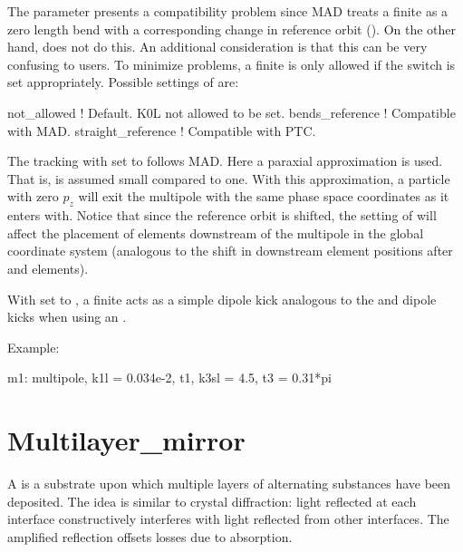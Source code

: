{The  parameter presents a compatibility problem since MAD treats a finite  as a zero
length bend with a corresponding change in reference orbit (). On the other hand,
 does not do this. An additional consideration is that this can be very confusing to
users. To minimize problems, a finite  is only allowed if the  switch is set
appropriately. Possible settings of  are:
\begin{example}
  not_allowed           ! Default. K0L not allowed to be set. 
  bends_reference       ! Compatible with MAD.
  straight_reference    ! Compatible with PTC.
\end{example}
The tracking with  set to  follows MAD. Here a paraxial
approximation is used. That is,  is assumed small compared to one. With this approximation,
a particle with zero $p_z$ will exit the multipole with the same phase space coordinates as it
enters with. Notice that since the reference orbit is shifted, the setting of  will affect
the placement of elements downstream of the multipole in the global coordinate system (analogous to
the shift in downstream element positions after  and  elements).

With  set to , a finite  acts as a simple dipole kick
analogous to the  and  dipole kicks when using an .

Example:
\begin{example}
  m1: multipole, k1l = 0.034e-2, t1, k3sl = 4.5, t3 = 0.31*pi
\end{example}

\newpage

\section{Multilayer_mirror}
\label{s:multilayer}

A  is a substrate upon which multiple layers of alternating substances have
been deposited. The idea is similar to crystal diffraction: light reflected at each interface
constructively interferes with light reflected from other interfaces. The amplified reflection
offsets losses due to absorption.

}

